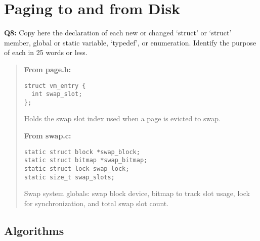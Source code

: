 \documentclass[a4paper,11pt]{paper}
\begin{document}
\section{Paging to and from Disk}

\textbf{Q8:} Copy here the declaration of each new or changed `struct' or `struct' member, global or static variable, `typedef', or enumeration.  Identify the purpose of each in 25 words or less.
\begin{quote}
\textbf{From page.h:}
\begin{verbatim}
struct vm_entry {
  int swap_slot;
};
\end{verbatim}
Holds the swap slot index used when a page is evicted to swap.

\textbf{From swap.c:}
\begin{verbatim}
static struct block *swap_block;
static struct bitmap *swap_bitmap;
static struct lock swap_lock;
static size_t swap_slots;
\end{verbatim}
Swap system globals: swap block device, bitmap to track slot usage, lock for synchronization, and total swap slot count.
\end{quote}


\pagebreak

\subsection{Algorithms}
\end{document}
